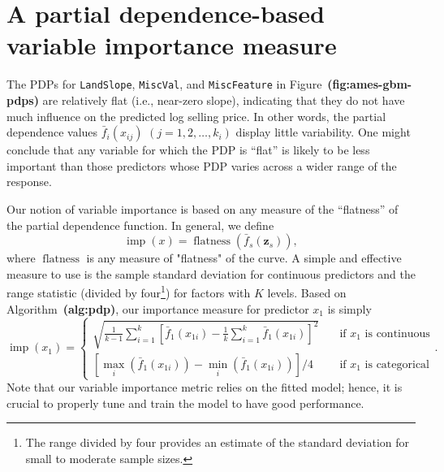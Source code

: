 \documentclass[12pt]{article}
\def\code#1{\texttt{#1}}
\def\ref#1{\textbf{(#1)}}
\DeclareMathOperator{\flatness}{flatness}
\DeclareMathOperator{\imp}{imp}
\begin{document}
\section{A partial dependence-based variable importance measure}
\label{sec:new}

The PDPs for \code{LandSlope}, \code{MiscVal}, and \code{MiscFeature} in Figure~\ref{fig:ames-gbm-pdps} are relatively flat (i.e., near-zero slope), indicating that they do not have much influence on the predicted log selling price. In other words, the partial dependence values $\bar{f}_i\left(x_{ij}\right)$ $\left(j = 1, 2, \dots, k_i\right)$ display little variability. One might conclude that any variable for which the PDP is ``flat'' is likely to be less important than those predictors whose PDP varies across a wider range of the response.

Our notion of variable importance is based on any measure of the ``flatness'' of the partial dependence function. In general, we define
\begin{equation*}
  \imp\left(x\right) = \flatness\left(\bar{f}_s\left(\boldsymbol{z}_s\right)\right),
\end{equation*}
where $\flatness$ is any measure of "flatness" of the curve. A simple and effective measure to use is the sample standard deviation for continuous predictors and the range statistic (divided by four\footnote{The range divided by four provides an estimate of the standard deviation for small to moderate sample sizes.}) for factors with $K$ levels. Based on Algorithm~\ref{alg:pdp}, our importance measure for predictor $x_1$ is simply
\begin{equation}
\label{eqn:vi}
  \imp\left(x_1\right) = 
  \begin{cases}
    \sqrt{\frac{1}{k - 1}\sum_{i = 1}^k\left[\bar{f}_1\left(x_{1i}\right) - \frac{1}{k}\sum_{i = 1}^k\bar{f}_1\left(x_{1i}\right)\right] ^ 2} & \quad \text{if } x_1 \text{ is continuous}\\
    \left[\max_i\left(\bar{f}_1\left(x_{1i}\right)\right) - \min_i\left(\bar{f}_1\left(x_{1i}\right)\right)\right] / 4 & \quad \text{if } x_1 \text{ is categorical}
  \end{cases}.
\end{equation}
Note that our variable importance metric relies on the fitted model; hence, it is crucial to properly tune and train the model to have good performance.
\end{document}
